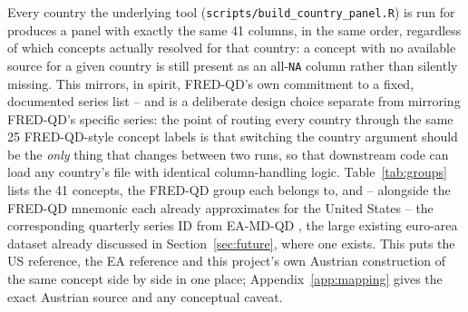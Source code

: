 \documentclass[11pt]{article}
\begin{document}
Every country the underlying tool (\texttt{scripts/build\_country\_panel.R})
is run for produces a panel with exactly the same 41 columns, in the same
order, regardless of which concepts actually resolved for that country: a
concept with no available source for a given country is still present as
an all-\texttt{NA} column rather than silently missing. This mirrors, in
spirit, FRED-QD's own commitment to a fixed, documented series list -- and
is a deliberate design choice separate from mirroring FRED-QD's specific
series: the point of routing every country through the same 25
FRED-QD-style concept labels is that switching the country argument should
be the \emph{only} thing that changes between two runs, so that downstream
code can load any country's file with identical column-handling logic.
Table~\ref{tab:groups} lists the 41 concepts, the FRED-QD group each
belongs to, and -- alongside the FRED-QD mnemonic each already
approximates for the United States -- the corresponding quarterly series
ID from EA-MD-QD \citep{barigozzi2026eamdqdpaper}, the large existing
euro-area dataset already discussed in Section~\ref{sec:future}, where
one exists. This puts the US reference, the EA reference and this
project's own Austrian construction of the same concept side by side in
one place; Appendix~\ref{app:mapping} gives the exact Austrian source and
any conceptual caveat.
\end{document}

